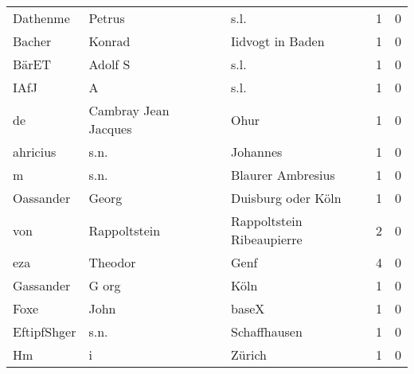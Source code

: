 \begin{center}
\begin{tiny}
\begin{longtabu}{llllrr}
                 Dathenme &                             Petrus &             &                                        s.l. &          1 &         0 \\
                   Bacher &                             Konrad &             &                            Iidvogt in Baden &          1 &         0 \\
                    BärET &                            Adolf S &             &                                        s.l. &          1 &         0 \\
                     IAfJ &                                  A &             &                                        s.l. &          1 &         0 \\
                       de &               Cambray Jean Jacques &             &                                        Ohur &          1 &         0 \\
                 ahricius &                               s.n. &             &                                    Johannes &          1 &         0 \\
                        m &                               s.n. &             &                           Blaurer Ambresius &          1 &         0 \\
                Oassander &                              Georg &             &                          Duisburg oder Köln &          1 &         0 \\
                      von &                       Rappoltstein &             &                   Rappoltstein Ribeaupierre &          2 &         0 \\
                      eza &                            Theodor &             &                                        Genf &          4 &         0 \\
                Gassander &                              G org &             &                                        Köln &          1 &         0 \\
                     Foxe &                               John &             &                                       baseX &          1 &         0 \\
              EftipfShger &                               s.n. &             &                                Schaffhausen &          1 &         0 \\
                       Hm &                                  i &             &                                      Zürich &          1 &         0 \\

\end{longtabu}
\end{tiny}
\end{center}
